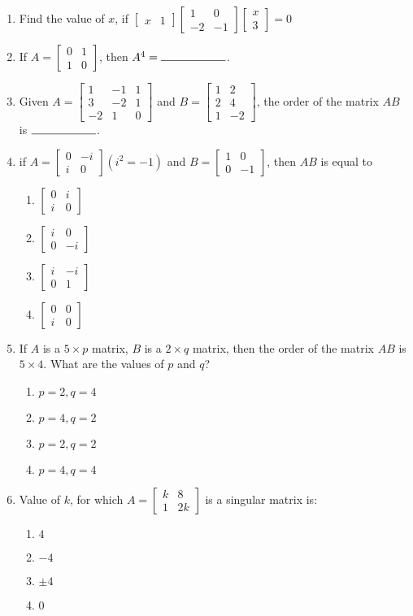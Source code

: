 \documentclass{article}
\providecommand{\myvec}[1]{\ensuremath{\begin{bmatrix}#1\end{bmatrix}}}
\begin{document}
\begin{enumerate}
    \item Find the value of $x$, if
    $\myvec{x & 1}
    \myvec{1 & 0 \\ -2 & -1}
    \myvec{x \\ 3} = 0$
    
    \item If $A = \myvec{0 & 1 \\ 1 & 0}$, then $A^4 = \rule{2cm}{0.15mm}$.

    \item Given $A = \myvec{1 & -1 & 1 \\ 3 & -2 & 1 \\ -2 & 1 & 0}$ and
    $B = \myvec{1 & 2 \\ 2 & 4 \\ 1 & -2}$, the order of the matrix $AB$ is $\rule{2cm}{0.15mm}$.
    
    \item if $A = \myvec{0 & -i \\ i & 0} (i^2 = -1)$ and  $B = \myvec{1 & 0 \\ 0 & -1}$, then $AB$ is equal to
    \begin{enumerate}
        \item $\myvec{0 & i \\ i & 0}$
        \item $\myvec{i & 0 \\ 0 & -i}$
        \item $\myvec{i & -i \\ 0 & 1}$
        \item $\myvec{0 & 0 \\ i & 0}$
    \end{enumerate}
   
   \item If $A$ is a $5 \times p$ matrix, $B$ is a $2 \times q$ matrix, then the order of the matrix $AB$ is $5 \times 4$. What are the values of $p$ and $q$?
   \begin{enumerate}
       \item $p = 2, q = 4$
       \item $p = 4, q = 2$
       \item $p = 2, q = 2$
       \item $p = 4, q = 4$
   \end{enumerate}

   \item Value of $k$, for which $A =\myvec{k & 8 \\ 1 & 2k}$ is a singular matrix is:
    \begin{enumerate}
        \item $4$
        \item $-4$
        \item $\pm4$
        \item $0$
    \end{enumerate}
        


\end{enumerate}
\end{document}

